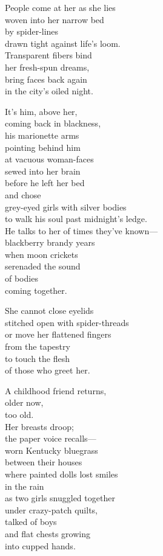 \documentclass[twoside,10pt]{book}
\begin{document}
People come at her as she lies\\
woven into her narrow bed\\
by spider-lines\\
drawn tight against life's loom.\\
Transparent fibers bind\\
her fresh-spun dreams,\\
bring faces back again\\
in the city's oiled night.

It's him, above her,\\
coming back in blackness,\\
his marionette arms\\
pointing behind him\\
at vacuous woman-faces\\
sewed into her brain\\
before he left her bed\\
and chose\\
grey-eyed girls with silver bodies\\
to walk his soul past midnight's ledge.\\
He talks to her of times they've known---\\
blackberry brandy years\\
when moon crickets\\
serenaded the sound\\
of bodies\\
coming together.

She cannot close eyelids\\
stitched open with spider-threads\\
or move her flattened fingers\\
from the tapestry\\
to touch the flesh\\
of those who greet her.

A childhood friend returns,\\
older now,\\
too old.\\
Her breasts droop;\\
the paper voice recalls---\\
worn Kentucky bluegrass\\
between their houses\\
where painted dolls lost smiles\\
in the rain\\
as two girls snuggled together\\
under crazy-patch quilts,\\
talked of boys\\
and flat chests growing\\
into cupped hands.
\end{document}
